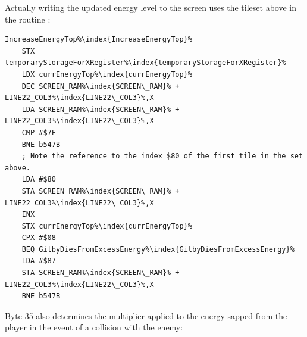Actually writing the updated energy level to the screen uses the tileset above in the routine
:
\begin{lstlisting}[escapechar=\%]
IncreaseEnergyTop%\index{IncreaseEnergyTop}%
    STX temporaryStorageForXRegister%\index{temporaryStorageForXRegister}%
    LDX currEnergyTop%\index{currEnergyTop}%
    DEC SCREEN_RAM%\index{SCREEN\_RAM}% + LINE22_COL3%\index{LINE22\_COL3}%,X
    LDA SCREEN_RAM%\index{SCREEN\_RAM}% + LINE22_COL3%\index{LINE22\_COL3}%,X
    CMP #$7F
    BNE b547B
    ; Note the reference to the index $80 of the first tile in the set above.
    LDA #$80 
    STA SCREEN_RAM%\index{SCREEN\_RAM}% + LINE22_COL3%\index{LINE22\_COL3}%,X
    INX
    STX currEnergyTop%\index{currEnergyTop}%
    CPX #$08
    BEQ GilbyDiesFromExcessEnergy%\index{GilbyDiesFromExcessEnergy}%
    LDA #$87
    STA SCREEN_RAM%\index{SCREEN\_RAM}% + LINE22_COL3%\index{LINE22\_COL3}%,X
    BNE b547B
\end{lstlisting}

Byte 35 also determines the multiplier applied to the energy sapped from the player in the 
event of a collision with the enemy:

